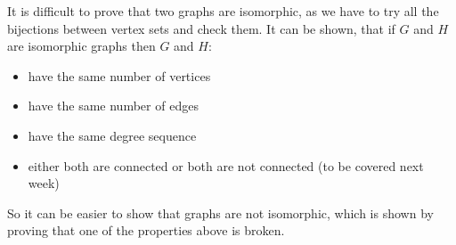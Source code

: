 It is difficult to prove that two graphs are isomorphic, as we have to try all the bijections between vertex sets and check them. It can be shown, that if $G$ and $H$ are isomorphic graphs then $G$ and $H$:
\begin{itemize}
    \item have the same number of vertices
    \item have the same number of edges
    \item have the same degree sequence
    \item either both are connected or both are not connected (to be covered next week)
\end{itemize}
So it can be easier to show that graphs are not isomorphic, which is shown by proving that one of the properties above is broken.
